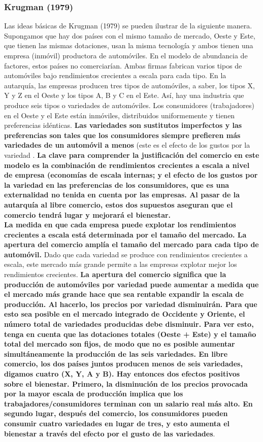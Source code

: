 \subsubsection{Krugman (1979)}
Las ideas básicas de Krugman (1979) se pueden ilustrar de la siguiente manera. Supongamos que hay dos países con el mismo tamaño de mercado, Oeste y Este, que tienen las mismas dotaciones, usan la misma tecnología y ambos tienen una empresa (inmóvil) productora de automóviles. En el modelo de abundancia de factores, estos países no comerciarían. Ambas firmas fabrican varios tipos de automóviles bajo rendimientos crecientes a escala para cada tipo. En la autarquía, las empresas producen tres tipos de automóviles, a saber, los tipos X, Y y Z en el Oeste y los tipos A, B y C en el Este. Así, hay una industria que produce seis tipos o variedades de automóviles. Los consumidores (trabajadores) en el Oeste y el Este están inmóviles, distribuidos uniformemente y tienen preferencias idénticas. \textbf{Las variedades son sustitutos imperfectos y las preferencias son tales que los consumidores siempre prefieren más variedades de un automóvil a menos} (este es el efecto de los gustos por la variedad . \textbf{La clave para comprender la justificación del comercio en este modelo es la combinación de rendimientos crecientes a escala a nivel de empresa (economías de escala internas; y el efecto de los gustos por la variedad en las preferencias de los consumidores, que es una externalidad no tenida en cuenta por las empresas. Al pasar de la autarquía al libre comercio, estos dos supuestos aseguran que el comercio tendrá lugar y mejorará el bienestar.}\\
\textbf{La medida en que cada empresa puede explotar los rendimientos crecientes a escala está determinada por el tamaño del mercado. La apertura del comercio amplía el tamaño del mercado para cada tipo de automóvil.} Dado que cada variedad se produce con rendimientos crecientes a escala, este mercado más grande permite a las empresas explotar mejor los rendimientos crecientes. \textbf{La apertura del comercio significa que la producción de automóviles por variedad puede aumentar a medida que el mercado más grande hace que sea rentable expandir la escala de producción. Al hacerlo, los precios por variedad disminuirán. Para que esto sea posible en el mercado integrado de Occidente y Oriente, el número total de variedades producidas debe disminuir. Para ver esto, tenga en cuenta que las dotaciones totales (Oeste + Este) y el tamaño total del mercado son fijos, de modo que no es posible aumentar simultáneamente la producción de las seis variedades. En libre comercio, los dos países juntos producen menos de seis variedades, digamos cuatro (X, Y, A y B). Hay entonces dos efectos positivos sobre el bienestar. Primero, la disminución de los precios provocada por la mayor escala de producción implica que los trabajadores/consumidores terminan con un salario real más alto. En segundo lugar, después del comercio, los consumidores pueden consumir cuatro variedades en lugar de tres, y esto aumenta el bienestar a través del efecto  por el gusto de las variedades}.\\
